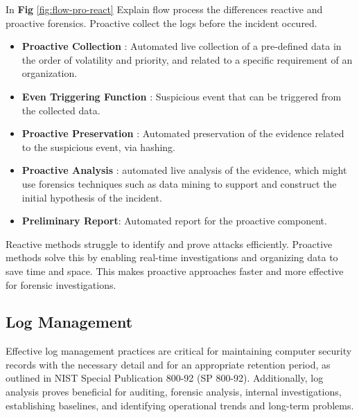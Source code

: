 In \textbf{Fig} \ref{fig:flow-pro-react} Explain flow process the differences reactive and proactive forensics. Proactive collect the logs before the incident occured.

\begin{itemize}
    \item \textbf{Proactive Collection} : Automated live collection of a pre-defined data in the order
of volatility and priority, and related to a specific requirement of an organization.
    \item \textbf{Even Triggering Function} : Suspicious event that can be triggered from the
collected data.
    \item \textbf{Proactive Preservation} : Automated preservation of the evidence related to the
suspicious event, via hashing.
    \item \textbf{Proactive Analysis} : automated live analysis of the evidence, which might use
forensics techniques such as data mining to support and construct the initial
hypothesis of the incident.
    \item \textbf{Preliminary Report}: Automated report for the proactive component. 
\end{itemize}

Reactive methods struggle to identify and prove attacks efficiently. Proactive methods solve this by enabling real-time investigations and organizing data to save time and space. This makes proactive approaches faster and more effective for forensic investigations\cite{SPNFFb16}.
\subsection{Log Management} Effective log management practices are critical for maintaining computer security records with the necessary detail and for an appropriate retention period, as outlined in NIST Special Publication 800-92 (SP 800-92). Additionally, log analysis proves beneficial for auditing, 
forensic analysis, internal investigations, establishing baselines, and identifying operational trends and long-term problems. \cite{kentnist800922006guide}

